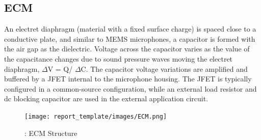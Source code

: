 \subsection{ECM}
An electret diaphragm (material with a fixed surface charge) is spaced close to a conductive plate, and similar to MEMS microphones, a capacitor is formed with the air gap as the dielectric. Voltage across the capacitor varies as the value of the capacitance changes due to sound pressure waves moving the electret diaphragm, $\Delta$V = Q/ $\Delta$C. The capacitor voltage variations are amplified and buffered by a JFET internal to the microphone housing. The JFET is typically configured in a common-source configuration, while an external load resistor and dc blocking capacitor are used in the external application circuit.
\break
\begin{figure}[H]
    \centering
    \texttt{[image: report\_template/images/ECM.png]}
    \caption{: ECM Structure}
    \label{fig:ECM}
\end{figure}
